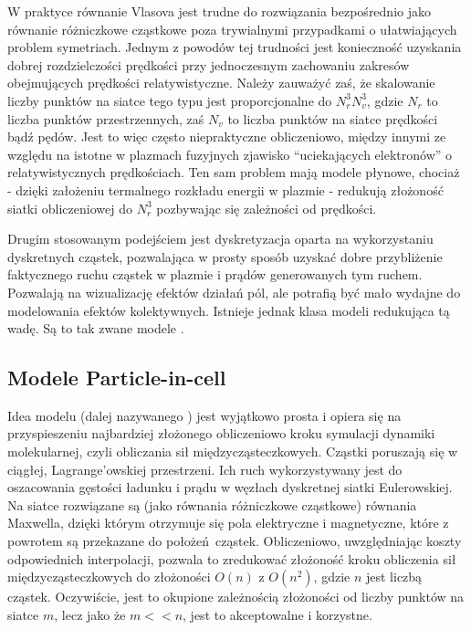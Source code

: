     W praktyce równanie Vlasova jest trudne do rozwiązania bezpośrednio
    jako równanie różniczkowe cząstkowe poza trywialnymi
    przypadkami o ułatwiających problem symetriach.  Jednym z powodów tej
    trudności jest konieczność uzyskania dobrej rozdzielczości prędkości przy
    jednoczesnym zachowaniu zakresów obejmujących prędkości relatywistyczne.
    Należy zauważyć zaś, że skalowanie
    liczby punktów na siatce tego typu jest proporcjonalne do $N_r^3 N_v^3$,
    gdzie $N_r$ to liczba punktów przestrzennych, zaś $N_v$ to liczba punktów
    na siatce prędkości bądź pędów. Jest to więc często niepraktyczne obliczeniowo,
    między innymi ze względu na istotne w plazmach fuzyjnych zjawisko
    ``uciekających elektronów'' o relatywistycznych prędkościach. Ten sam problem mają
    modele płynowe, chociaż - dzięki założeniu termalnego rozkładu energii w plazmie -
    redukują złożoność siatki obliczeniowej do $N_r^3$ pozbywając się
    zależności od prędkości.

    Drugim stosowanym podejściem jest dyskretyzacja oparta na wykorzystaniu
    dyskretnych cząstek, pozwalająca w prosty sposób uzyskać
    dobre przybliżenie faktycznego ruchu cząstek w plazmie i prądów
    generowanych tym ruchem. Pozwalają na wizualizację efektów działań
    pól, ale potrafią być mało wydajne do modelowania efektów kolektywnych.
    Istnieje jednak klasa modeli redukująca tą wadę.
    Są to tak zwane modele .

    \subsection{Modele Particle-in-cell}

    Idea modelu  (dalej nazywanego ) jest wyjątkowo
    prosta i opiera się na przyspieszeniu najbardziej złożonego obliczeniowo
    kroku symulacji dynamiki molekularnej, czyli obliczania sił
    międzycząsteczkowych.  Cząstki poruszają się w ciągłej, Lagrange'owskiej
    przestrzeni.  Ich ruch wykorzystywany jest do oszacowania gęstości ładunku
    i prądu w węzłach dyskretnej siatki Eulerowskiej. Na siatce rozwiązane
    są (jako równania różniczkowe cząstkowe) równania Maxwella, dzięki którym
    otrzymuje się pola elektryczne i magnetyczne, które z powrotem są przekazane do
    położeń cząstek.  Obliczeniowo, uwzględniając koszty odpowiednich interpolacji,
    pozwala to zredukować złożoność kroku obliczenia sił międzycząsteczkowych
do złożoności $O(n)$ z $O(n^2)$, gdzie $n$ jest liczbą cząstek.
    Oczywiście, jest to okupione zależnością złożoności od liczby punktów na siatce $m$, lecz jako że $m << n$,
    jest to akceptowalne i korzystne.

